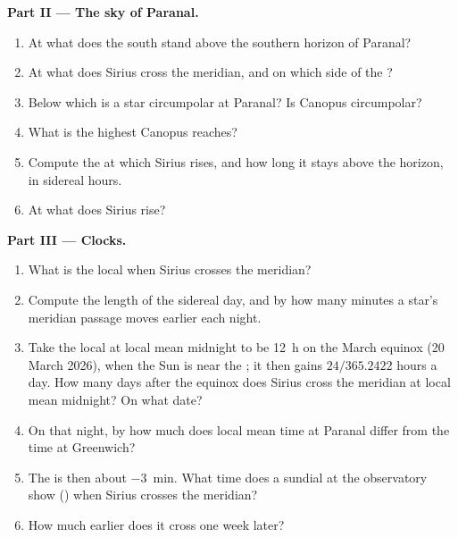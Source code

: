 \begin{problem}
\medskip
\noindent\textbf{Part II --- The sky of Paranal.}
\begin{enumerate}[resume]
  \item At what  does the south  stand above the
        southern horizon of Paranal?
  \item At what  does Sirius cross the meridian, and on which side of
        the ?
  \item Below which  is a star circumpolar at Paranal? Is Canopus
        circumpolar?
  \item What is the highest  Canopus reaches?
  \item Compute the  at which Sirius rises, and how long it stays
        above the horizon, in sidereal hours.
  \item At what  does Sirius rise?
\end{enumerate}

\medskip
\noindent\textbf{Part III --- Clocks.}
\begin{enumerate}[resume]
  \item What is the local  when Sirius crosses the meridian?
  \item Compute the length of the sidereal day, and by how many minutes a
        star's meridian passage moves earlier each night.
  \item Take the local  at local mean midnight to be
        \qty{12}{h} on the March equinox (20 March 2026), when the Sun is near
        the ; it then gains $24/365.2422$ hours a day.
        How many days after the equinox does Sirius cross the meridian at
        local mean midnight? On what date?
  \item On that night, by how much does local mean time at Paranal differ
        from the time at Greenwich?
  \item The  is then about \qty{-3}{min}. What time does a
        sundial at the observatory show () when Sirius
        crosses the meridian?
  \item How much earlier does it cross one week later?
\end{enumerate}


\end{problem}
